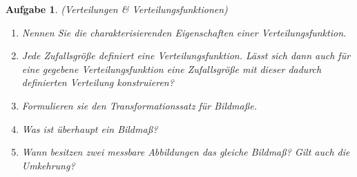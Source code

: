 \documentclass[11pt, a4paper, ngerman]{article}
\newtheorem{aufgabe}{Aufgabe}
\begin{document}
\begin{aufgabe} (Verteilungen \& Verteilungsfunktionen)
    \begin{enumerate}
        \item 
        Nennen Sie die charakterisierenden Eigenschaften einer Verteilungsfunktion. 
        \item 
        Jede Zufallsgröße definiert eine Verteilungsfunktion. Lässt sich dann auch für eine gegebene Verteilungsfunktion eine Zufallsgröße mit dieser dadurch definierten Verteilung konstruieren? 
        \item 
        Formulieren sie den Transformationssatz für Bildmaße. 
        \item 
        Was ist überhaupt ein Bildmaß?
        \item 
        Wann besitzen zwei messbare Abbildungen das gleiche Bildmaß? Gilt auch die Umkehrung? 
    \end{enumerate}
\end{aufgabe}
\end{document}
